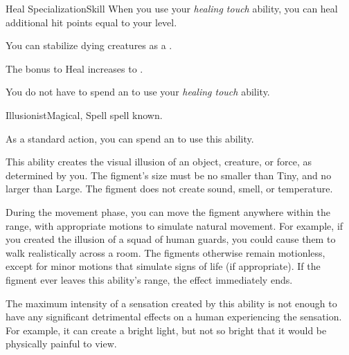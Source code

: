\begin{feat}{Heal Specialization}{Skill}
         When you use your \textit{healing touch} ability, you can heal additional hit points equal to your level.

         You can stabilize dying creatures as a .

         The bonus to Heal increases to .

         You do not have to spend an  to use your \textit{healing touch} ability.
    \end{feat}

    \begin{feat}{Illusionist}{Magical, Spell}
        \featpre {} spell known.
        \featben

         As a standard action, you can spend an  to use this ability.
        \begin{ability}
            \begin{spelltargetinginfo}
                \spellrng{\rngmed}
            \end{spelltargetinginfo}
            \begin{spelleffects}
                \spelleffect This ability creates the visual illusion of an object, creature, or force, as determined by you.
                The figment's size must be no smaller than Tiny, and no larger than Large.
                The figment does not create sound, smell, or temperature.

                During the movement phase, you can move the figment anywhere within the range, with appropriate motions to simulate natural movement.
                For example, if you created the illusion of a squad of human guards, you could cause them to walk realistically across a room.
                The figments otherwise remain motionless, except for minor motions that simulate signs of life (if appropriate).
                If the figment ever leaves this ability's range, the effect immediately ends.

                The maximum intensity of a sensation created by this ability is not enough to have any significant detrimental effects on a human experiencing the sensation.
                For example, it can create a bright light, but not so bright that it would be physically painful to view.


\end{spelleffects}
\end{ability}
\end{feat}
